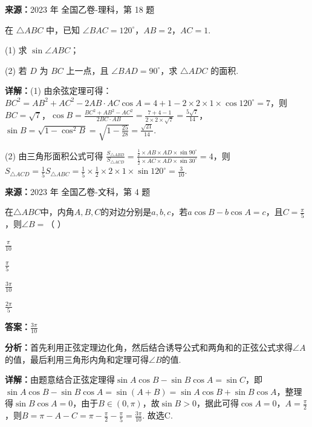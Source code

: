 \begin{question}[points=12]
\textbf{来源：}2023 年 全国乙卷-理科，第 18 题\par
在 $\triangle ABC$ 中，已知 $\angle BAC=120^\circ$，$AB=2$，$AC=1$.



(1) 求 $\sin\angle ABC$；



(2) 若 $D$ 为 $BC$ 上一点，且 $\angle BAD=90^\circ$，求 $\triangle ADC$ 的面积.
\begin{solution}

\textbf{详解：}(1) 由余弦定理可得：$BC^2=AB^2+AC^2-2AB\cdot AC\cos A=4+1-2\times2\times1\times\cos120^\circ=7$，则 $BC=\sqrt{7}$，$\cos B=\frac{BC^2+AB^2-AC^2}{2BC\cdot AB}=\frac{7+4-1}{2\times2\times\sqrt{7}}=\frac{5\sqrt{7}}{14}$，$\sin B=\sqrt{1-\cos^2B}=\sqrt{1-\frac{25}{28}}=\frac{\sqrt{21}}{14}$.

(2) 由三角形面积公式可得 $\frac{S_{\triangle ABD}}{S_{\triangle ACD}}=\frac{\frac{1}{2}\times AB\times AD\times\sin90^\circ}{\frac{1}{2}\times AC\times AD\times\sin30^\circ}=4$，则 $S_{\triangle ACD}=\frac{1}{5}S_{\triangle ABC}=\frac{1}{5}\times\frac{1}{2}\times2\times1\times\sin120^\circ=\frac{3}{10}$.
\end{solution}
\end{question}

\begin{question}[points=5]
\textbf{来源：}2023 年 全国乙卷-文科，第 4 题\par
在$\triangle ABC$中，内角$A,B,C$的对边分别是$a,b,c$，若$a\cos B-b\cos A=c$，且$C=\frac{\pi}{5}$，则$\angle B=$（   ）
\begin{choices}
  \item $\frac{\pi}{10}$
  \item $\frac{\pi}{5}$
  \item $\frac{3\pi}{10}$
  \item $\frac{2\pi}{5}$
\end{choices}
\begin{solution}
\textbf{答案：}$\frac{3\pi}{10}$

\textbf{分析：}首先利用正弦定理边化角，然后结合诱导公式和两角和的正弦公式求得$\angle A$的值，最后利用三角形内角和定理可得$\angle B$的值.

\textbf{详解：}由题意结合正弦定理得$\sin A\cos B-\sin B\cos A=\sin C$，即$\sin A\cos B-\sin B\cos A=\sin(A+B)=\sin A\cos B+\sin B\cos A$，整理得$\sin B\cos A=0$，由于$B\in(0,\pi)$，故$\sin B>0$，据此可得$\cos A=0$，$A=\frac{\pi}{2}$，则$B=\pi-A-C=\pi-\frac{\pi}{2}-\frac{\pi}{5}=\frac{3\pi}{10}$. 故选C.
\end{solution}
\end{question}

